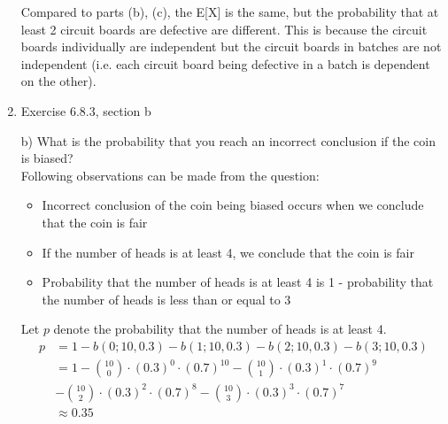 \documentclass[14pt]{extreport}
\begin{document}
\begin{enumerate}[label=(\alph*)]
Compared to parts (b), (c), the E[X] is the same, but the probability that at least 2 circuit boards are defective are different. This is because the circuit boards individually are independent but the circuit boards in batches are not independent (i.e. each circuit board being defective in a batch is dependent on the other).\\

\item  Exercise	6.8.3,	section b
\newline

b) What is the probability that you reach an incorrect conclusion if the coin is biased?\\

Following observations can be made from the question:
\begin{itemize}
  \item Incorrect conclusion of the coin being biased occurs when we conclude that the coin is fair
  \item If the number of heads is at least 4, we conclude that the coin is fair
  \item Probability that the number of heads is at least 4 is 1 - probability that the number of heads is less than or equal to 3
\end{itemize}

Let $p$ denote the probability that the number of heads is at least 4.
\begin{align*}
        p  &=  1 - b\left ( 0; 10, 0.3 \right ) - b\left ( 1; 10, 0.3 \right ) - b\left ( 2; 10, 0.3 \right ) - b\left ( 3; 10, 0.3 \right )\\
                &= 1 - \binom{10}{0}\cdot (0.3)^{0}\cdot (0.7)^{10} - \binom{10}{1}\cdot (0.3)^{1}\cdot (0.7)^{9} \\
                &- \binom{10}{2}\cdot (0.3)^{2}\cdot (0.7)^{8} - \binom{10}{3}\cdot (0.3)^{3}\cdot (0.7)^{7}\\
                &\approx 0.35
\end{align*}

\end{enumerate}
\newpage
\end{document}
